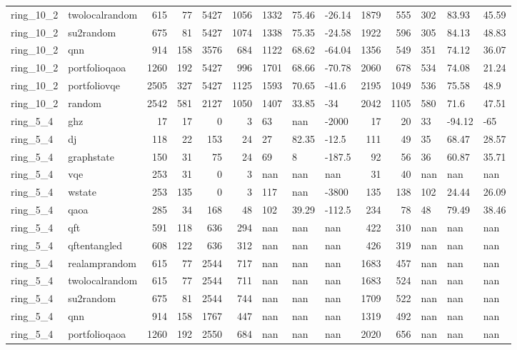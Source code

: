 \begin{longtable}{llrrrrlllrrlll}
ring\_10\_2 & twolocalrandom & 615 & 77 & 5427 & 1056 & 1332 & 75.46 & -26.14 & 1879 & 555 & 302 & 83.93 & 45.59 \\
ring\_10\_2 & su2random & 675 & 81 & 5427 & 1074 & 1338 & 75.35 & -24.58 & 1922 & 596 & 305 & 84.13 & 48.83 \\
ring\_10\_2 & qnn & 914 & 158 & 3576 & 684 & 1122 & 68.62 & -64.04 & 1356 & 549 & 351 & 74.12 & 36.07 \\
ring\_10\_2 & portfolioqaoa & 1260 & 192 & 5427 & 996 & 1701 & 68.66 & -70.78 & 2060 & 678 & 534 & 74.08 & 21.24 \\
ring\_10\_2 & portfoliovqe & 2505 & 327 & 5427 & 1125 & 1593 & 70.65 & -41.6 & 2195 & 1049 & 536 & 75.58 & 48.9 \\
ring\_10\_2 & random & 2542 & 581 & 2127 & 1050 & 1407 & 33.85 & -34 & 2042 & 1105 & 580 & 71.6 & 47.51 \\
ring\_5\_4 & ghz & 17 & 17 & 0 & 3 & 63 & nan & -2000 & 17 & 20 & 33 & -94.12 & -65 \\
ring\_5\_4 & dj & 118 & 22 & 153 & 24 & 27 & 82.35 & -12.5 & 111 & 49 & 35 & 68.47 & 28.57 \\
ring\_5\_4 & graphstate & 150 & 31 & 75 & 24 & 69 & 8 & -187.5 & 92 & 56 & 36 & 60.87 & 35.71 \\
ring\_5\_4 & vqe & 253 & 31 & 0 & 3 & nan & nan & nan & 31 & 40 & nan & nan & nan \\
ring\_5\_4 & wstate & 253 & 135 & 0 & 3 & 117 & nan & -3800 & 135 & 138 & 102 & 24.44 & 26.09 \\
ring\_5\_4 & qaoa & 285 & 34 & 168 & 48 & 102 & 39.29 & -112.5 & 234 & 78 & 48 & 79.49 & 38.46 \\
ring\_5\_4 & qft & 591 & 118 & 636 & 294 & nan & nan & nan & 422 & 310 & nan & nan & nan \\
ring\_5\_4 & qftentangled & 608 & 122 & 636 & 312 & nan & nan & nan & 426 & 319 & nan & nan & nan \\
ring\_5\_4 & realamprandom & 615 & 77 & 2544 & 717 & nan & nan & nan & 1683 & 457 & nan & nan & nan \\
ring\_5\_4 & twolocalrandom & 615 & 77 & 2544 & 711 & nan & nan & nan & 1683 & 524 & nan & nan & nan \\
ring\_5\_4 & su2random & 675 & 81 & 2544 & 744 & nan & nan & nan & 1709 & 522 & nan & nan & nan \\
ring\_5\_4 & qnn & 914 & 158 & 1767 & 447 & nan & nan & nan & 1319 & 492 & nan & nan & nan \\
ring\_5\_4 & portfolioqaoa & 1260 & 192 & 2550 & 684 & nan & nan & nan & 2020 & 656 & nan & nan & nan \\

\end{longtable}
